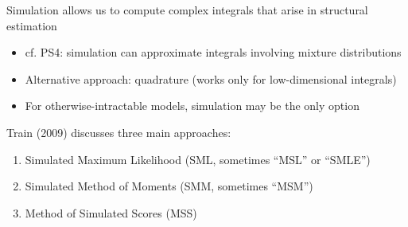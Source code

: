 \documentclass[aspectratio=169]{beamer}
\begin{document}
\begin{frame}

Simulation allows us to compute complex integrals that arise in structural estimation

\bigskip\par



\begin{itemize}
\itemsep1.5em
\item<4-> cf. PS4: simulation can approximate integrals involving mixture distributions
\item<5-> Alternative approach: quadrature (works only for low-dimensional integrals)
\item<6-> For otherwise-intractable models, simulation may be the only option
\end{itemize}
\end{frame}






\begin{frame}

Train (2009) discusses three main approaches:

\bigskip

\begin{enumerate}
\itemsep1.5em
\item<2-> Simulated Maximum Likelihood (SML, sometimes ``MSL'' or ``SMLE'')
\item<3-> Simulated Method of Moments (SMM, sometimes ``MSM'')
\item<4-> Method of Simulated Scores (MSS)
\end{enumerate}

\bigskip
{}

\end{frame}
\end{document}
